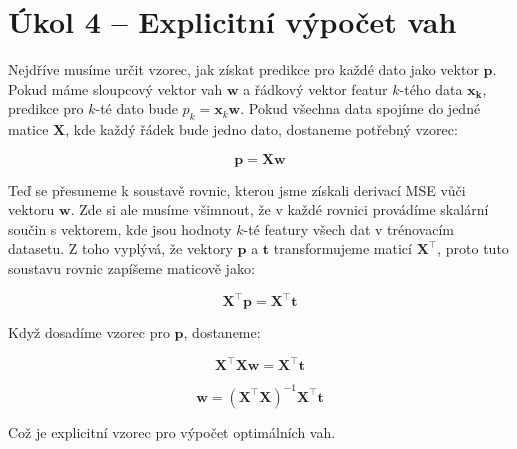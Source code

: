 \documentclass{fkssolpub}
\author{Ondřej Sedláček}
\begin{document}
 

\section{Úkol 4 -- Explicitní výpočet vah}

Nejdříve musíme určit vzorec, jak získat predikce pro každé dato jako vektor $\mathbf{p}$.
Pokud máme sloupcový vektor vah $\mathbf{w}$ a řádkový vektor featur $k$-tého
data $\mathbf{x_k}$, predikce pro $k$-té dato bude $p_k = \mathbf{x}_k \mathbf{w}$.
Pokud všechna data spojíme do jedné matice $\mathbf{X}$, kde každý řádek bude jedno dato,
dostaneme potřebný vzorec:

\[
  \mathbf{p} = \mathbf{X} \mathbf{w}
\]

Teď se přesuneme k soustavě rovnic, kterou jsme získali derivací MSE vůči vektoru
$\mathbf{w}$. Zde si ale musíme všimnout, že v každé rovnici provádíme skalární
součin s vektorem, kde jsou hodnoty $k$-té featury všech dat v trénovacím datasetu. 
Z toho vyplývá, že vektory $\mathbf{p}$ a $\mathbf{t}$ transformujeme maticí 
$\mathbf{X}^{\top}$, proto tuto soustavu rovnic zapíšeme maticově jako:

\[
  \mathbf{X}^{\top} \mathbf{p} = \mathbf{X}^\top \mathbf{t}
\]

Když dosadíme vzorec pro $\mathbf{p}$, dostaneme:

\[
  \mathbf{X}^\top \mathbf{X} \mathbf{w} = \mathbf{X}^\top \mathbf{t}
\]

\[
  \mathbf{w} = (\mathbf{X}^\top \mathbf{X})^{-1} \mathbf{X}^\top \mathbf{t}
\]

Což je explicitní vzorec pro výpočet optimálních vah.
\end{document}
